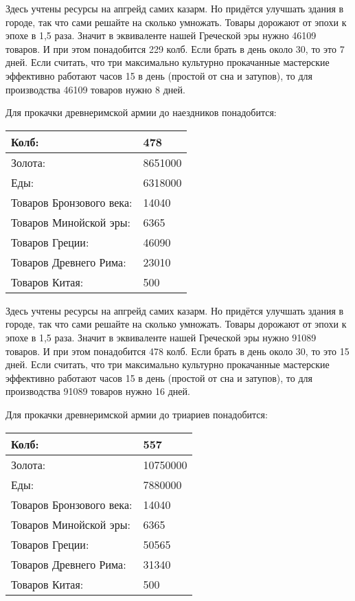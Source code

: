 Здесь учтены ресурсы на апгрейд самих казарм.
Но придётся улучшать здания в городе, так что сами решайте на сколько умножать.
Товары дорожают от эпохи к эпохе в 1,5 раза.
Значит в эквиваленте нашей Греческой эры нужно 46109 товаров.
И при этом понадобится 229 колб. Если брать в день около 30, то это 7 дней.
Если считать, что три максимально культурно прокачанные мастерские эффективно работают часов 15 в день (простой от сна и затупов),
то для производства 46109 товаров нужно 8 дней.



Для прокачки древнеримской армии до наездников понадобится:

\begin{center}
    \begin{tabular}[h!]{|l|l|}
        \hline
        Колб:                    & 478\\\hline
        Золота:                  & 8651000\\\hline
        Еды:                     & 6318000\\\hline
        Товаров Бронзового века: & 14040\\\hline
        Товаров Минойской эры:   & 6365\\\hline
        Товаров Греции:          & 46090\\\hline
        Товаров Древнего Рима:   & 23010\\\hline
        Товаров Китая:           & 500\\\hline
    \end{tabular}
\end{center}

Здесь учтены ресурсы на апгрейд самих казарм.
Но придётся улучшать здания в городе, так что сами решайте на сколько умножать.
Товары дорожают от эпохи к эпохе в 1,5 раза.
Значит в эквиваленте нашей Греческой эры нужно 91089 товаров.
И при этом понадобится 478 колб. Если брать в день около 30, то это 15 дней.
Если считать, что три максимально культурно прокачанные мастерские эффективно работают часов 15 в день (простой от сна и затупов),
то для производства 91089 товаров нужно 16 дней.



Для прокачки древнеримской армии до триариев понадобится:

\begin{center}
    \begin{tabular}[h!]{|l|l|}
        \hline
        Колб:                    & 557\\\hline
        Золота:                  & 10750000\\\hline
        Еды:                     & 7880000\\\hline
        Товаров Бронзового века: & 14040\\\hline
        Товаров Минойской эры:   & 6365\\\hline
        Товаров Греции:          & 50565\\\hline
        Товаров Древнего Рима:   & 31340\\\hline
        Товаров Китая:           & 500\\\hline
    \end{tabular}
\end{center}

